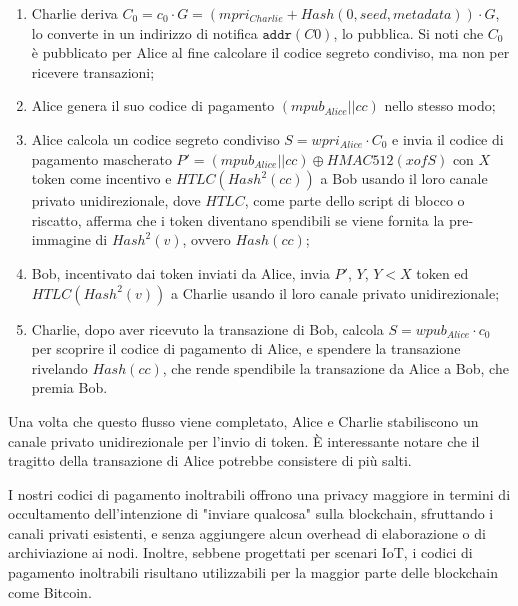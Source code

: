 \begin{enumerate}
    \item Charlie deriva $C_0 = c_0\cdot G = (mpri_{Charlie} + Hash(0, seed, metadata))\cdot G$, lo converte in un indirizzo di notifica $\texttt{addr}(C0)$, lo pubblica. Si noti che $C_0$ è pubblicato per Alice al fine calcolare il codice segreto condiviso, ma non per ricevere     transazioni;

    \item Alice genera il suo codice di pagamento $(mpub_{Alice}||cc)$ nello stesso modo;

    \item Alice calcola un codice segreto condiviso $S = wpri_{Alice}\cdot C_0$ e invia il codice di pagamento mascherato $P' = (mpub_{Alice}||cc) \oplus HMAC512(xofS)$ con $X$ token come incentivo e $HTLC(Hash^2(cc))$ a Bob usando il loro canale privato unidirezionale, dove $HTLC$, come parte dello script di blocco o riscatto, afferma che i token diventano
    spendibili se viene fornita la pre-immagine di $Hash^2(v)$, ovvero $Hash (cc)$;

    \item Bob, incentivato dai token inviati da Alice, invia $P'$, $Y$, $Y < X$ token ed $HTLC(Hash^2(v))$ a Charlie usando il loro canale privato unidirezionale;

    \item Charlie, dopo aver ricevuto la transazione di Bob, calcola $S = wpub_{Alice}\cdot c_0$ per scoprire il codice di pagamento di Alice, e spendere la transazione rivelando $Hash(cc)$, che rende spendibile la transazione da Alice a Bob, che premia Bob.
\end{enumerate}

Una volta che questo flusso viene completato, Alice e Charlie stabiliscono un canale privato unidirezionale per l'invio di token. È interessante notare che il tragitto della transazione di Alice potrebbe consistere di più salti.

I nostri codici di pagamento inoltrabili offrono una privacy maggiore in termini di occultamento dell'intenzione di "inviare qualcosa" sulla blockchain, sfruttando i canali privati esistenti, e senza aggiungere alcun overhead di elaborazione o di archiviazione ai nodi. Inoltre, sebbene progettati per scenari IoT, i codici di pagamento inoltrabili risultano utilizzabili per la maggior parte delle blockchain come Bitcoin.